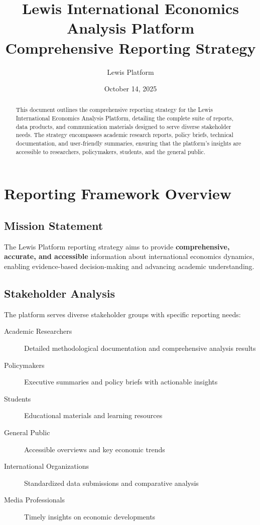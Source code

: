 \documentclass[11pt,a4paper]{article}
\title{\textbf{Lewis International Economics Analysis Platform} \\
\large Comprehensive Reporting Strategy}
\author{Lewis Platform}
\date{October 14, 2025}
\begin{document}
\maketitle

\begin{abstract}
This document outlines the comprehensive reporting strategy for the Lewis International Economics Analysis Platform, detailing the complete suite of reports, data products, and communication materials designed to serve diverse stakeholder needs. The strategy encompasses academic research reports, policy briefs, technical documentation, and user-friendly summaries, ensuring that the platform's insights are accessible to researchers, policymakers, students, and the general public.
\end{abstract}

\tableofcontents
\newpage

\section{Reporting Framework Overview}

\subsection{Mission Statement}
The Lewis Platform reporting strategy aims to provide \textbf{comprehensive, accurate, and accessible} information about international economics dynamics, enabling evidence-based decision-making and advancing academic understanding.

\subsection{Stakeholder Analysis}
The platform serves diverse stakeholder groups with specific reporting needs:

\begin{description}
    \item[Academic Researchers] Detailed methodological documentation and comprehensive analysis results
    \item[Policymakers] Executive summaries and policy briefs with actionable insights
    \item[Students] Educational materials and learning resources
    \item[General Public] Accessible overviews and key economic trends
    \item[International Organizations] Standardized data submissions and comparative analysis
    \item[Media Professionals] Timely insights on economic developments
\end{description}
\end{document}
